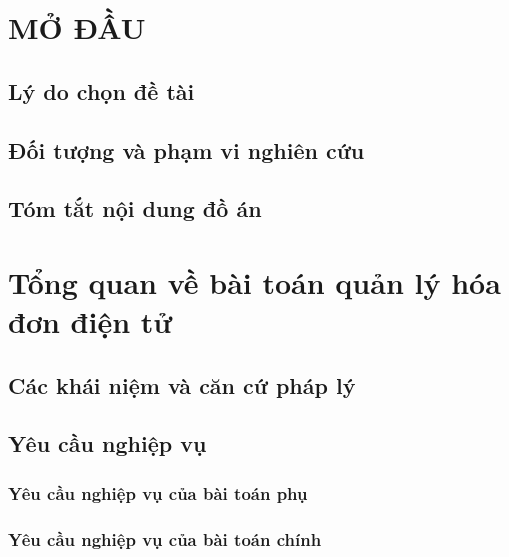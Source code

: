 \documentclass{report} %
\begin{document}








% 

\chapter*{\centering MỞ ĐẦU}
\section*{Lý do chọn đề tài}

\section*{Đối tượng và phạm vi nghiên cứu}

\section*{Tóm tắt nội dung đồ án}


\chapter{Tổng quan về bài toán quản lý hóa đơn điện tử}

\section{Các khái niệm và căn cứ pháp lý}

\section{Yêu cầu nghiệp vụ}

\subsection{Yêu cầu nghiệp vụ của bài toán phụ}

\subsection{Yêu cầu nghiệp vụ của bài toán chính}
\end{document}
